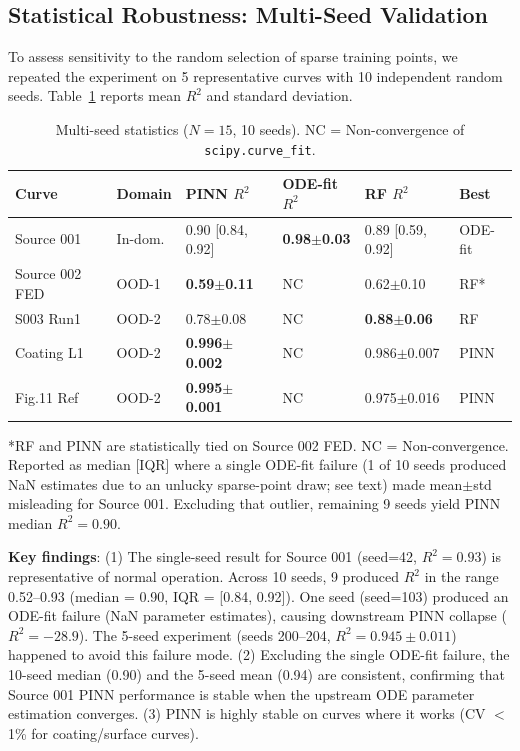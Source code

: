 \documentclass[review]{elsarticle}
\begin{document}
\subsection{Statistical Robustness: Multi-Seed Validation}
\label{sec:multiseed}

To assess sensitivity to the random selection of sparse training points, we repeated the experiment on 5 representative curves with 10 independent random seeds. Table~\ref{tab:multiseed} reports mean $R^2$ and standard deviation.

\begin{table}[htbp]
\centering
\caption{Multi-seed statistics ($N=15$, 10 seeds). NC = Non-convergence of \texttt{scipy.curve\_fit}.}
\label{tab:multiseed}
\begin{tabular}{@{}p{3cm}lp{2.2cm}p{2.2cm}p{2.2cm}l@{}}
\toprule
Curve & Domain & PINN $R^2$ & ODE-fit $R^2$ & RF $R^2$ & Best \\
\midrule
Source 001 & In-dom. & 0.90 [0.84, 0.92] & \textbf{0.98$\pm$0.03} & 0.89 [0.59, 0.92] & ODE-fit \\
Source 002 FED & OOD-1 & \textbf{0.59$\pm$0.11} & NC & 0.62$\pm$0.10 & RF* \\
S003 Run1 & OOD-2 & 0.78$\pm$0.08 & NC & \textbf{0.88$\pm$0.06} & RF \\
Coating L1 & OOD-2 & \textbf{0.996$\pm$0.002} & NC & 0.986$\pm$0.007 & PINN \\
Fig.11 Ref & OOD-2 & \textbf{0.995$\pm$0.001} & NC & 0.975$\pm$0.016 & PINN \\
\bottomrule
\end{tabular}
\end{table}

*RF and PINN are statistically tied on Source 002 FED. NC = Non-convergence. Reported as median [IQR] where a single ODE-fit failure (1 of 10 seeds produced NaN estimates due to an unlucky sparse-point draw; see text) made mean$\pm$std misleading for Source 001. Excluding that outlier, remaining 9 seeds yield PINN median $R^2 = 0.90$.

\textbf{Key findings}: (1) The single-seed result for Source 001 (seed=42, $R^2=0.93$) is representative of normal operation. Across 10 seeds, 9 produced $R^2$ in the range 0.52--0.93 (median = 0.90, IQR = [0.84, 0.92]). One seed (seed=103) produced an ODE-fit failure (NaN parameter estimates), causing downstream PINN collapse ($R^2 = -28.9$). The 5-seed experiment (seeds 200--204, $R^2 = 0.945 \pm 0.011$) happened to avoid this failure mode. (2) Excluding the single ODE-fit failure, the 10-seed median (0.90) and the 5-seed mean (0.94) are consistent, confirming that Source 001 PINN performance is stable when the upstream ODE parameter estimation converges. (3) PINN is highly stable on curves where it works (CV $<$ 1\% for coating/surface curves).
\end{document}
